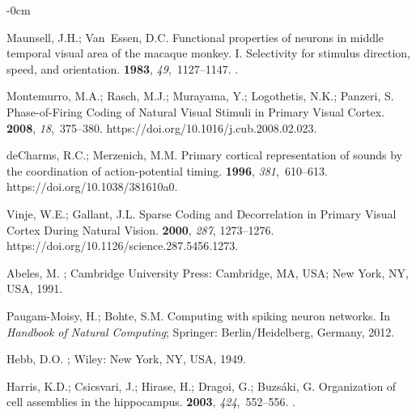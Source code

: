 \documentclass[brainsci, %
               review,accept,pdftex,moreauthors
               ]{Definitions/mdpi}
\begin{document}
\begin{adjustwidth}{-\extralength}{0cm}
\begin{thebibliography}{999}
Maunsell, J.H.; Van~Essen, D.C.
\newblock Functional properties of neurons in middle temporal visual area of
  the macaque monkey. {I}. {Selectivity} for stimulus direction, speed, and
  orientation.
 {\bf 1983}, {\em 49},~1127--1147.
.

Montemurro, M.A.; Rasch, M.J.; Murayama, Y.; Logothetis, N.K.; Panzeri, S.
\newblock Phase-of-{Firing} {Coding} of {Natural} {Visual} {Stimuli} in
  {Primary} {Visual} {Cortex}.
 {\bf 2008}, {\em 18},~375--380.
  {{https://doi.org/10.1016/j.cub.2008.02.023}}.

deCharms, R.C.; Merzenich, M.M.
\newblock Primary cortical representation of sounds by the coordination of
  action-potential timing.
 {\bf 1996}, {\em 381},~610--613.
  {{https://doi.org/10.1038/381610a0}}.

Vinje, W.E.; Gallant, J.L.
\newblock Sparse {Coding} and {Decorrelation} in {Primary} {Visual} {Cortex}
  {During} {Natural} {Vision}.
 {\bf 2000}, {\em 287}, 1273--1276.
  {{https://doi.org/10.1126/science.287.5456.1273}}.

Abeles, M.
; Cambridge
  University Press: Cambridge, MA, USA; New York, NY, USA, 1991.

Paugam-Moisy, H.; Bohte, S.M.
\newblock Computing with spiking neuron networks. In {\em Handbook of Natural
  Computing}; Springer:  {Berlin/Heidelberg, Germany,} %
  2012.

Hebb, D.O.
;
  Wiley: New York, NY, USA, 1949.

Harris, K.D.; Csicsvari, J.; Hirase, H.; Dragoi, G.; Buzsáki, G.
\newblock Organization of cell assemblies in the hippocampus.
 {\bf 2003}, {\em 424},~552--556.
.


\end{thebibliography}
\end{adjustwidth}
\end{document}
